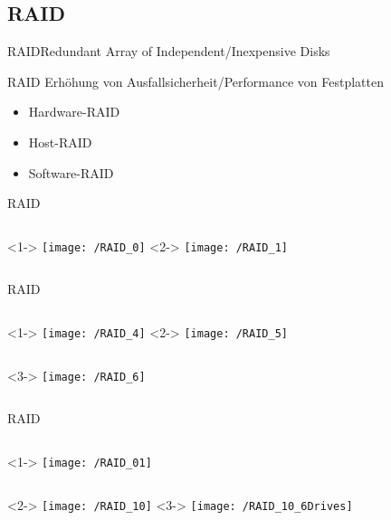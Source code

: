 \documentclass[pdflatex, ngerman]{beamer}
\begin{document}
\subsection{RAID}

\begin{frame}{RAID}{Redundant Array of Independent/Inexpensive Disks}
\begin{block}{RAID}
Erhöhung von Ausfallsicherheit/Performance von Festplatten

\begin{itemize}
	\item Hardware-RAID
	\item Host-RAID
	\item Software-RAID
\end{itemize}
\end{block}
\end{frame}

\begin{frame}{RAID}%
\begin{columns}
<1->
\centering\texttt{[image: /RAID\_0]}
<2->
\centering\texttt{[image: /RAID\_1]}
\end{columns}
\end{frame}

\begin{frame}{RAID}%
\begin{columns}
<1->
\centering\texttt{[image: /RAID\_4]}
<2->
\centering\texttt{[image: /RAID\_5]}
\end{columns}
\begin{columns}
<3->
\centering\texttt{[image: /RAID\_6]}
\end{columns}
\end{frame}

\begin{frame}{RAID}%

\begin{columns}
<1->
\centering\texttt{[image: /RAID\_01]}
\end{columns}
\begin{columns}
<2->
\centering\texttt{[image: /RAID\_10]}
<3->
\centering\texttt{[image: /RAID\_10\_6Drives]}
\end{columns}
\end{frame}
\end{document}
